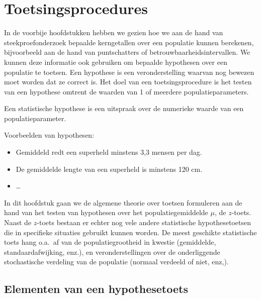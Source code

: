 \chapter{Toetsingsprocedures}
\label{ch:toetsingsprocedures}

In de voorbije hoofdstukken hebben we gezien hoe we aan de hand van steekproefonderzoek bepaalde kerngetallen over een populatie kunnen berekenen, bijvoorbeeld aan de hand van puntschatters of betrouwbaarheidsintervallen. We kunnen deze informatie ook gebruiken om bepaalde hypothesen over een populatie te toetsen. Een hypothese is een veronderstelling waarvan nog bewezen moet worden dat ze correct is. Het doel van een toetsingsprocedure is het testen van een hypothese omtrent de waarden van 1 of meerdere populatieparameters.

\begin{definition}
  Een statistische hypothese is een uitspraak over de numerieke waarde van een populatieparameter.
\end{definition}

Voorbeelden van hypothesen:

\begin{itemize}
  \item Gemiddeld redt een superheld minstens 3,3 mensen per dag.
  \item De gemiddelde lengte van een superheld is minstens 120 cm.
  \item \dots
\end{itemize}

In dit hoofdstuk gaan we de algemene theorie over toetsen formuleren aan de hand van het testen van hypothesen over het populatiegemiddelde $\mu$, de $z$-toets. Naast de $z$-toets bestaan er echter nog vele andere statistische hypothesetoetsen die in specifieke situaties gebruikt kunnen worden. De meest geschikte statistische toets hang o.a.~af van de populatiegrootheid in kwestie (gemiddelde, standaardafwijking, enz.), en veronderstellingen over de onderliggende stochastische verdeling van de populatie (normaal verdeeld of niet, enz,).

\section{Elementen van een hypothesetoets}
\label{sec:elementen-hypothesetoets}

